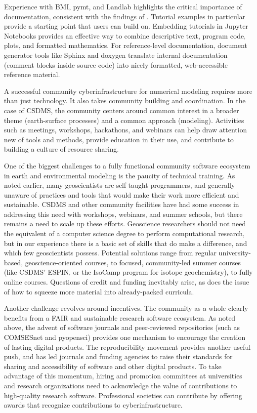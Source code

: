 \documentclass[12pt]{amsart}
\begin{document}
Experience with BMI, pymt, and Landlab highlights the critical importance of documentation, consistent with the findings of \citet{lawrence2015science}. Tutorial examples in particular provide a starting point that users can build on. Embedding tutorials in Jupyter Notebooks provides an effective way to combine descriptive text, program code, plots, and formatted mathematics. For reference-level documentation, document generator tools like Sphinx and doxygen translate internal documentation (comment blocks inside source code) into nicely formatted, web-accessible reference material.

A successful community cyberinfrastructure for numerical modeling requires more than just technology. It also takes community building and coordination. In the case of CSDMS, the community centers around common interest in a broader theme (earth-surface processes) and a common approach (modeling). Activities such as meetings, workshops, hackathons, and webinars can help draw attention new of tools and methods, provide education in their use, and contribute to building a culture of resource sharing.

One of the biggest challenges to a fully functional community software ecosystem in earth and environmental modeling is the paucity of technical training. As noted earlier, many geoscientists are self-taught programmers, and generally unaware of practices and tools that would make their work more efficient and sustainable. CSDMS and other community facilities have had some success in addressing this need with workshops, webinars, and summer schools, but there remains a need to scale up these efforts. Geoscience researchers should not need the equivalent of a computer science degree to perform computational research, but in our experience there is a basic set of skills that do make a difference, and which few geoscientists possess. Potential solutions range from regular university-based, geoscience-oriented courses, to focused, community-led summer courses (like CSDMS' ESPIN, or the IsoCamp program for isotope geochemistry), to fully online courses. Questions of credit and funding inevitably arise, as does the issue of how to squeeze more material into already-packed curricula.  

Another challenge revolves around incentives. The community as a whole clearly benefits from a FAIR and sustainable research software ecosystem. As noted above, the advent of software journals and peer-reviewed repositories (such as COMSESnet and pyopensci) provides one mechanism to encourage the creation of lasting digital products. The reproducibility movement provides another useful push, and has led journals and funding agencies to raise their standards for sharing and accessibility of software and other digital products. To take advantage of this momentum, hiring and promotion committees at universities and research organizations need to acknowledge the value of contributions to high-quality research software. Professional societies can contribute by offering awards that recognize contributions to cyberinfrastructure.
\end{document}
